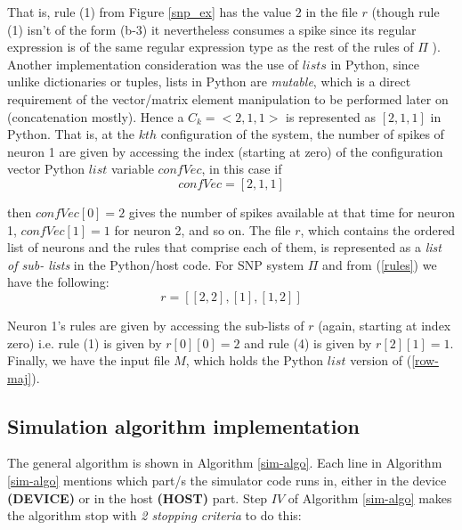 \documentclass{svmultm}
\begin{document}
That is, rule (1) from Figure \ref{snp_ex} has the value $2$ in the file $r$ (though rule (1)
isn't of the form (b-3) it nevertheless consumes a spike since
its regular expression is of the same regular expression type
as the rest of the rules of ${\Pi}$ ). Another implementation
consideration was the use of $lists$ in Python, since unlike
dictionaries or tuples, lists in Python are  \textit{mutable}, which is a
direct requirement of the vector/matrix element
manipulation to be performed later on (concatenation
mostly). Hence a $C_k = <2, 1, 1>$ is
represented as $[ 2, 1, 1 ]$ in Python. That is, at the $kth$
configuration of the system, the number of spikes of neuron
1 are given by accessing the index (starting at zero) of the
configuration vector Python $list$ variable $confVec$, in this case if
\begin{equation}\label{confvec}
confVec = [ 2, 1, 1 ]
\end{equation}
	
then $confVec[ 0 ] = 2$ gives the number of spikes available at
that time for neuron 1, $confVec[ 1 ] = 1$ for neuron 2, and so
on. The file $r$, which contains the ordered list of neurons and
the rules that comprise each of them, is represented as a \textit{list of sub-
lists} in the Python/host code. For SNP system ${\Pi}$ and from (\ref{rules}) we have the
following:
\begin{equation}\label{rule-list}
r = [ [ 2, 2 ], [ 1 ], [ 1, 2 ] ]
\end{equation}

Neuron 1's rules are given by accessing the sub-lists of $r$
(again, starting at index zero) i.e. rule (1) is given by $r[ 0 ][ 0 ]
= 2$ and rule (4) is given by $r[ 2 ][ 1 ] = 1$.
Finally, we have the input file $M$, which holds the Python $list$ version of (\ref{row-maj}).

\subsection{Simulation algorithm implementation}\label{snp-sim-algo}

	
The general algorithm is shown in Algorithm \ref{sim-algo}. {Each line in Algorithm \ref{sim-algo} mentions
which part/s the simulator code runs in, either in the device \textbf{(DEVICE)} or in the host \textbf{(HOST)} part.} 
Step $IV$ of Algorithm \ref{sim-algo} makes
the algorithm stop with \textit{2 stopping criteria} to do this:
\end{document}
